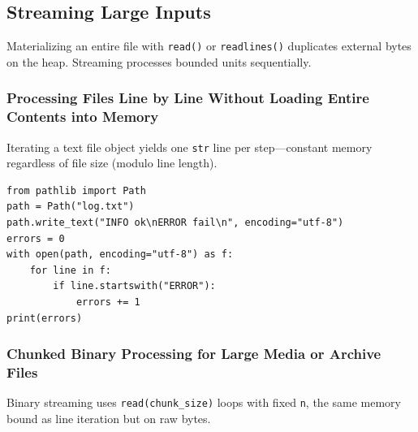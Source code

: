 \subsection{Streaming Large Inputs}

Materializing an entire file with \texttt{read()} or \texttt{readlines()} duplicates external bytes on the heap. Streaming processes bounded units sequentially.

\subsubsection{Processing Files Line by Line Without Loading Entire Contents into Memory}

Iterating a text file object yields one \texttt{str} line per step---constant memory regardless of file size (modulo line length).

\begin{verbatim}
from pathlib import Path
path = Path("log.txt")
path.write_text("INFO ok\nERROR fail\n", encoding="utf-8")
errors = 0
with open(path, encoding="utf-8") as f:
    for line in f:
        if line.startswith("ERROR"):
            errors += 1
print(errors)
\end{verbatim}

\subsubsection{Chunked Binary Processing for Large Media or Archive Files}

Binary streaming uses \texttt{read(chunk\_size)} loops with fixed \texttt{n}, the same memory bound as line iteration but on raw bytes.
